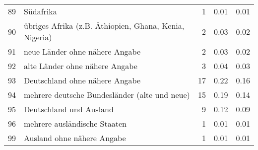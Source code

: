 \begin{longtable}{lXrrr}
        89 & \multicolumn{1}{X}{Südafrika} & %
          \num{1} &
          \num[round-mode=places,round-precision=2]{0.01} &
          \num[round-mode=places,round-precision=2]{0.01} \\

        90 & \multicolumn{1}{X}{übriges Afrika (z.B. Äthiopien, Ghana, Kenia, Nigeria)} & %
          \num{2} &
          \num[round-mode=places,round-precision=2]{0.03} &
          \num[round-mode=places,round-precision=2]{0.02} \\

        91 & \multicolumn{1}{X}{neue Länder ohne nähere Angabe} & %
          \num{2} &
          \num[round-mode=places,round-precision=2]{0.03} &
          \num[round-mode=places,round-precision=2]{0.02} \\

        92 & \multicolumn{1}{X}{alte Länder ohne nähere Angabe} & %
          \num{3} &
          \num[round-mode=places,round-precision=2]{0.04} &
          \num[round-mode=places,round-precision=2]{0.03} \\

        93 & \multicolumn{1}{X}{Deutschland ohne nähere Angabe} & %
          \num{17} &
          \num[round-mode=places,round-precision=2]{0.22} &
          \num[round-mode=places,round-precision=2]{0.16} \\

        94 & \multicolumn{1}{X}{mehrere deutsche Bundesländer (alte und neue)} & %
          \num{15} &
          \num[round-mode=places,round-precision=2]{0.19} &
          \num[round-mode=places,round-precision=2]{0.14} \\

        95 & \multicolumn{1}{X}{Deutschland und Ausland} & %
          \num{9} &
          \num[round-mode=places,round-precision=2]{0.12} &
          \num[round-mode=places,round-precision=2]{0.09} \\

        96 & \multicolumn{1}{X}{mehrere ausländische Staaten} & %
          \num{1} &
          \num[round-mode=places,round-precision=2]{0.01} &
          \num[round-mode=places,round-precision=2]{0.01} \\

        99 & \multicolumn{1}{X}{Ausland ohne nähere Angabe} & %
          \num{1} &
          \num[round-mode=places,round-precision=2]{0.01} &
          \num[round-mode=places,round-precision=2]{0.01} \\


\end{longtable}
